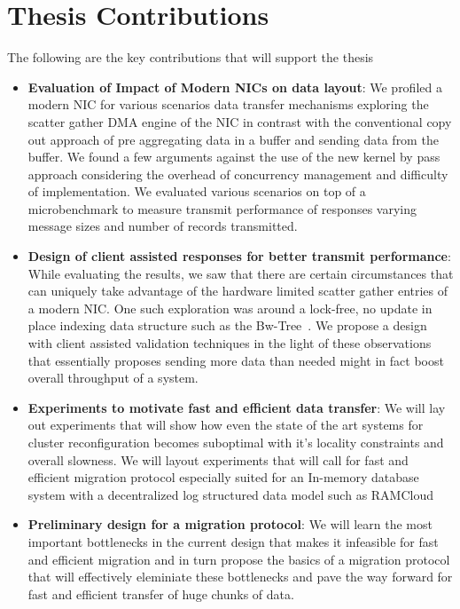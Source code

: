 \section{Thesis Contributions}
The following are the key contributions that will support the thesis
\begin{itemize}
\item{\textbf{Evaluation of Impact of Modern NICs on data layout}}: We profiled a modern NIC for various 
scenarios data transfer mechanisms exploring the scatter gather DMA engine of the NIC in contrast
with the conventional copy out approach of pre aggregating data in a buffer and sending data from the buffer.
We found a few arguments against the use of the new kernel by pass approach considering the overhead
of concurrency management and difficulty of implementation. We evaluated various scenarios on top of a
microbenchmark to measure transmit performance of responses varying message sizes and number of records
transmitted.
\item{\textbf{Design of client assisted responses for better transmit performance}}: While evaluating the results,
we saw that there are certain circumstances that can uniquely take advantage of the hardware limited 
scatter gather entries of a modern NIC. One such exploration was around a lock-free, no update in place 
indexing data structure such as the Bw-Tree~\cite{bw-tree}. We propose a design with client assisted 
validation techniques in the light of these observations that essentially proposes sending more data than 
needed might in fact boost overall throughput of a system.
\item{\textbf{Experiments to motivate fast and efficient data transfer}}: We will lay out experiments that will 
show how even the state of the art systems for cluster reconfiguration becomes suboptimal with it's locality
constraints and overall slowness. We will layout experiments that will call for fast and efficient migration protocol
especially suited for an In-memory database system with a decentralized log structured data model such as RAMCloud
\item{\textbf{Preliminary design for a migration protocol}}: We will learn the most important bottlenecks in the current design
that makes it infeasible for fast and efficient migration and in turn propose the basics of a migration protocol that 
will effectively eleminiate these bottlenecks and pave the way forward for fast and efficient transfer of huge chunks of data.
\end{itemize}

